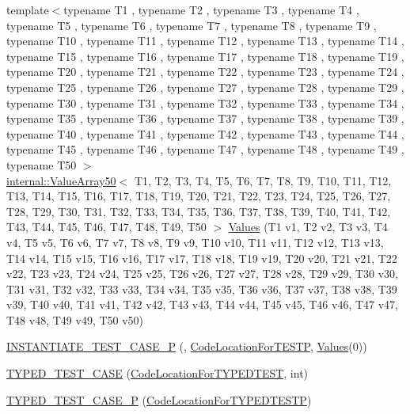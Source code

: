 \begin{DoxyCompactItemize}
\item 
{\footnotesize template$<$typename T1 , typename T2 , typename T3 , typename T4 , typename T5 , typename T6 , typename T7 , typename T8 , typename T9 , typename T10 , typename T11 , typename T12 , typename T13 , typename T14 , typename T15 , typename T16 , typename T17 , typename T18 , typename T19 , typename T20 , typename T21 , typename T22 , typename T23 , typename T24 , typename T25 , typename T26 , typename T27 , typename T28 , typename T29 , typename T30 , typename T31 , typename T32 , typename T33 , typename T34 , typename T35 , typename T36 , typename T37 , typename T38 , typename T39 , typename T40 , typename T41 , typename T42 , typename T43 , typename T44 , typename T45 , typename T46 , typename T47 , typename T48 , typename T49 , typename T50 $>$ }\\\mbox{\hyperlink{classtesting_1_1internal_1_1_value_array50}{internal\+::\+Value\+Array50}}$<$ T1, T2, T3, T4, T5, T6, T7, T8, T9, T10, T11, T12, T13, T14, T15, T16, T17, T18, T19, T20, T21, T22, T23, T24, T25, T26, T27, T28, T29, T30, T31, T32, T33, T34, T35, T36, T37, T38, T39, T40, T41, T42, T43, T44, T45, T46, T47, T48, T49, T50 $>$ \mbox{\hyperlink{namespacetesting_a7b6008393a1fa7b55b07fbad67c1c811}{Values}} (T1 v1, T2 v2, T3 v3, T4 v4, T5 v5, T6 v6, T7 v7, T8 v8, T9 v9, T10 v10, T11 v11, T12 v12, T13 v13, T14 v14, T15 v15, T16 v16, T17 v17, T18 v18, T19 v19, T20 v20, T21 v21, T22 v22, T23 v23, T24 v24, T25 v25, T26 v26, T27 v27, T28 v28, T29 v29, T30 v30, T31 v31, T32 v32, T33 v33, T34 v34, T35 v35, T36 v36, T37 v37, T38 v38, T39 v39, T40 v40, T41 v41, T42 v42, T43 v43, T44 v44, T45 v45, T46 v46, T47 v47, T48 v48, T49 v49, T50 v50)
\item 
\mbox{\hyperlink{namespacetesting_a5b049e97e9082df909e4a0f740ff5d02}{I\+N\+S\+T\+A\+N\+T\+I\+A\+T\+E\+\_\+\+T\+E\+S\+T\+\_\+\+C\+A\+S\+E\+\_\+P}} (, \mbox{\hyperlink{classtesting_1_1_code_location_for_t_e_s_t_p}{Code\+Location\+For\+T\+E\+S\+TP}}, \mbox{\hyperlink{namespacetesting_abd3c87b40c2a0663691c9b617ed5fcc2}{Values}}(0))
\item 
\mbox{\hyperlink{namespacetesting_af0459cc6cdfbbae821caf802c7f2bb72}{T\+Y\+P\+E\+D\+\_\+\+T\+E\+S\+T\+\_\+\+C\+A\+SE}} (\mbox{\hyperlink{classtesting_1_1_code_location_for_t_y_p_e_d_t_e_s_t}{Code\+Location\+For\+T\+Y\+P\+E\+D\+T\+E\+ST}}, int)
\item 
\mbox{\hyperlink{namespacetesting_a439eefbc85668f74fd9e0c2cb7c7d0b0}{T\+Y\+P\+E\+D\+\_\+\+T\+E\+S\+T\+\_\+\+C\+A\+S\+E\+\_\+P}} (\mbox{\hyperlink{classtesting_1_1_code_location_for_t_y_p_e_d_t_e_s_t_p}{Code\+Location\+For\+T\+Y\+P\+E\+D\+T\+E\+S\+TP}})

\end{DoxyCompactItemize}
